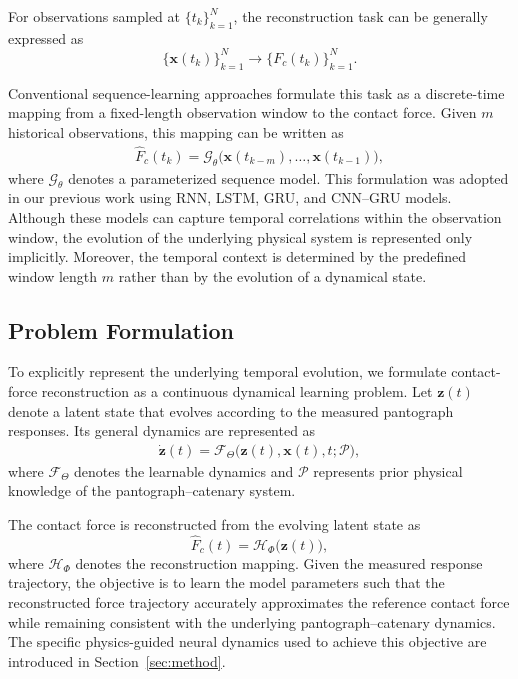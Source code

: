 \documentclass[journal,twoside]{IEEEtran}
\begin{document}
For observations sampled at $\{t_k\}_{k=1}^{N}$, the reconstruction task can
be generally expressed as
\begin{equation}
    \{\mathbf{x}(t_k)\}_{k=1}^{N}
    \longrightarrow
    \{F_c(t_k)\}_{k=1}^{N}.
    \label{eq:reconstruction_task}
\end{equation}

Conventional sequence-learning approaches formulate this task as a
discrete-time mapping from a fixed-length observation window to the contact
force. Given $m$ historical observations, this mapping can be written as
\begin{equation}
\begin{aligned}
    \hat{F}_{c}(t_k)
    =
    \mathcal{G}_{\theta}
    \big(
        \mathbf{x}(t_{k-m}),\ldots,
        \mathbf{x}(t_{k-1})
    \big),
\end{aligned}
\label{eq:discrete_mapping}
\end{equation}
where $\mathcal{G}_{\theta}$ denotes a parameterized sequence model. This
formulation was adopted in our previous work using RNN, LSTM, GRU, and
CNN--GRU models. Although these models can capture temporal correlations
within the observation window, the evolution of the underlying physical
system is represented only implicitly. Moreover, the temporal context is
determined by the predefined window length $m$ rather than by the evolution
of a dynamical state.

\subsection{Problem Formulation}

To explicitly represent the underlying temporal evolution, we formulate
contact-force reconstruction as a continuous dynamical learning problem. Let
$\mathbf{z}(t)$ denote a latent state that evolves according to the measured
pantograph responses. Its general dynamics are represented as
\begin{equation}
\begin{aligned}
    \dot{\mathbf{z}}(t)
    =
    \mathcal{F}_{\Theta}
    \big(
        \mathbf{z}(t),
        \mathbf{x}(t),
        t;
        \mathcal{P}
    \big),
\end{aligned}
\label{eq:general_dynamics}
\end{equation}
where $\mathcal{F}_{\Theta}$ denotes the learnable dynamics and
$\mathcal{P}$ represents prior physical knowledge of the
pantograph--catenary system.

The contact force is reconstructed from the evolving latent state as
\begin{equation}
    \hat{F}_{c}(t)
    =
    \mathcal{H}_{\Phi}\big(\mathbf{z}(t)\big),
    \label{eq:force_reconstruction}
\end{equation}
where $\mathcal{H}_{\Phi}$ denotes the reconstruction mapping. Given the
measured response trajectory, the objective is to learn the model parameters
such that the reconstructed force trajectory accurately approximates the
reference contact force while remaining consistent with the underlying
pantograph--catenary dynamics. The specific physics-guided neural dynamics
used to achieve this objective are introduced in
Section~\ref{sec:method}.
\end{document}
